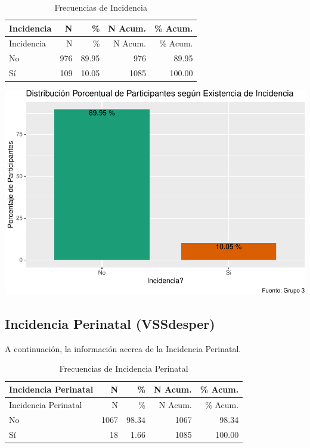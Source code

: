 \documentclass[
]{article}
\begin{document}
\begin{longtable}[]{@{}lrrrr@{}}
\caption{Frecuencias de Incidencia}\tabularnewline
\toprule\noalign{}
Incidencia & N & \% & N Acum. & \% Acum. \\
\midrule\noalign{}
\endfirsthead
\toprule\noalign{}
Incidencia & N & \% & N Acum. & \% Acum. \\
\midrule\noalign{}
\endhead
\bottomrule\noalign{}
\endlastfoot
No & 976 & 89.95 & 976 & 89.95 \\
Sí & 109 & 10.05 & 1085 & 100.00 \\
\end{longtable}

\includegraphics{Info_Dinix_02_files/figure-latex/30_VSS-1.pdf}

\subsection{Incidencia Perinatal
(VSSdesper)}\label{incidencia-perinatal-vssdesper}

A continuación, la información acerca de la Incidencia Perinatal.

\begin{longtable}[]{@{}lrrrr@{}}
\caption{Frecuencias de Incidencia Perinatal}\tabularnewline
\toprule\noalign{}
Incidencia Perinatal & N & \% & N Acum. & \% Acum. \\
\midrule\noalign{}
\endfirsthead
\toprule\noalign{}
Incidencia Perinatal & N & \% & N Acum. & \% Acum. \\
\midrule\noalign{}
\endhead
\bottomrule\noalign{}
\endlastfoot
No & 1067 & 98.34 & 1067 & 98.34 \\
Sí & 18 & 1.66 & 1085 & 100.00 \\
\end{longtable}
\end{document}
